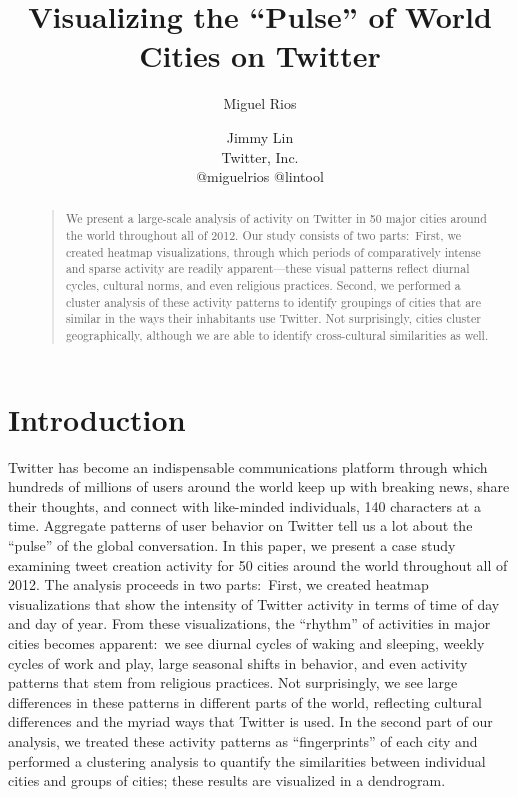 \documentclass[letterpaper]{article}
\begin{document}
%
\title{Visualizing the ``Pulse'' of World Cities on Twitter}
\author{Miguel Rios \and Jimmy Lin\\
Twitter, Inc.\\
@miguelrios @lintool
}



\maketitle

\begin{abstract}
\begin{quote}
We present a large-scale analysis of activity on Twitter in 50 major
cities around the world throughout all of 2012. Our study consists of
two parts:\ First, we created heatmap visualizations, through which
periods of comparatively intense and sparse activity are readily
apparent---these visual patterns reflect diurnal cycles, cultural
norms, and even religious practices. Second, we performed a cluster
analysis of these activity patterns to identify groupings of cities
that are similar in the ways their inhabitants use Twitter. Not
surprisingly, cities cluster geographically, although we are able to
identify cross-cultural similarities as well.
\end{quote}
\end{abstract}

\section{Introduction}

Twitter has become an indispensable communications platform through
which hundreds of millions of users around the world keep up with
breaking news, share their thoughts, and connect with like-minded
individuals, 140 characters at a time. Aggregate patterns of user
behavior on Twitter tell us a lot about the ``pulse'' of the global
conversation. In this paper, we present a case study examining tweet
creation activity for 50 cities around the world throughout all of
2012. The analysis proceeds in two parts:\ First, we created heatmap
visualizations that show the intensity of Twitter activity in terms of
time of day and day of year. From these visualizations, the ``rhythm''
of activities in major cities becomes apparent:\ we see diurnal cycles
of waking and sleeping, weekly cycles of work and play, large seasonal
shifts in behavior, and even activity patterns that stem from
religious practices. Not surprisingly, we see large
differences in these patterns in different parts of the world,
reflecting cultural differences and the myriad ways that Twitter is
used. In the second part of our analysis, we treated these activity
patterns as ``fingerprints'' of each city and performed a clustering
analysis to quantify the similarities between individual cities and
groups of cities; these results are visualized in a dendrogram.
\end{document}
